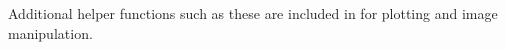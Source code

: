 Additional helper functions such as these are included in  for plotting and image manipulation.




% 
%

%










